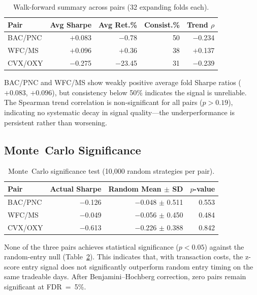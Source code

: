 \documentclass{ieeeaccess}
\begin{document}


\begin{table}[t]
\centering
\caption{Walk-forward summary across pairs (32 expanding folds each).}
\label{tab:walkforward_summary}
\small
\begin{tabular}{lrrrr}
\toprule
Pair & Avg Sharpe & Avg Ret.\% & Consist.\% & Trend $\rho$ \\
\midrule
BAC/PNC & $+$0.083 & $-$0.78 & 50 & $-$0.234 \\
WFC/MS  & $+$0.096 & $+$0.36 & 38 & $+$0.137 \\
CVX/OXY & $-$0.275 & $-$23.45 & 31 & $-$0.239 \\
\bottomrule
\end{tabular}
\end{table}

BAC/PNC and WFC/MS show weakly positive average fold Sharpe ratios ($+0.083$, $+0.096$), but consistency below 50\% indicates the signal is unreliable.
The Spearman trend correlation is non-significant for all pairs ($p > 0.19$), indicating no systematic decay in signal quality---the underperformance is persistent rather than worsening.

\subsection{Monte~Carlo Significance}
\label{sec:montecarlo}

\begin{table}[t]
\centering
\caption{Monte~Carlo significance test (10{,}000 random strategies per pair).}
\label{tab:montecarlo}
\small
\begin{tabular}{lrrr}
\toprule
Pair & Actual Sharpe & Random Mean $\pm$ SD & $p$-value \\
\midrule
BAC/PNC & $-$0.126 & $-$0.048 $\pm$ 0.511 & 0.553 \\
WFC/MS  & $-$0.049 & $-$0.056 $\pm$ 0.450 & 0.484 \\
CVX/OXY & $-$0.613 & $-$0.226 $\pm$ 0.388 & 0.842 \\
\bottomrule
\end{tabular}
\end{table}

None of the three pairs achieves statistical significance ($p < 0.05$) against the random-entry null (Table~\ref{tab:montecarlo}).
This indicates that, with transaction costs, the z-score entry signal does not significantly outperform random entry timing on the same tradeable days.
After Benjamini--Hochberg correction, zero pairs remain significant at FDR~=~5\%.
\end{document}
